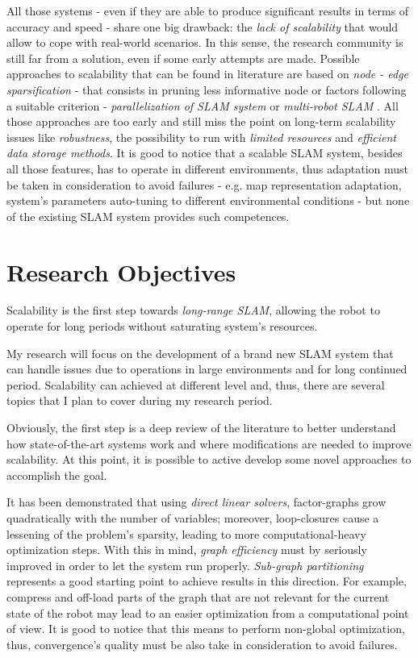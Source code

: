 \documentclass[10pt,a4paper, notitlepage]{report}
\begin{document}
All those systems - even if they are able to produce significant results in terms of accuracy and speed - share one big drawback: the \textit{lack of scalability} that would allow to cope with real-world scenarios. In this sense, the research community is still far from a solution, even if some early attempts are made. Possible approaches to scalability that can be found in literature are based on \textit{node - edge sparsification} \cite{kretzschmar2011graph-pruninig} \cite{huang2013consistent} - that consists in pruning less informative node or factors following a suitable criterion - \textit{parallelization of SLAM system} \cite{ni-dallaert2010nested-dissections} \cite{ni-dallaert2007tectonicSAM} \cite{grisetti2010hogman} or \textit{multi-robot SLAM} \cite{cunningham2013ddfSAM2} \cite{lazaro2013mr-slam}. All those approaches are too early and still miss the point on long-term scalability issues like \textit{robustness}, the possibility to run with \textit{limited resources} and \textit{efficient data storage methods}. It is good to notice that a scalable SLAM system, besides all those features, has to operate in different environments, thus adaptation must be taken in consideration to avoid failures - e.g. map representation adaptation, system's parameters auto-tuning to different environmental conditions - but none of the existing SLAM system provides such competences.

\section*{Research Objectives}
Scalability is the first step towards \textit{long-range SLAM}, allowing the robot to operate for long periods without saturating system's resources. 

My research will focus on the development of a brand new SLAM system that can handle issues due to operations in large environments and for long continued period. Scalability can achieved at different level and, thus, there are several topics that I plan to cover during my research period.

Obviously, the first step is a deep review of the literature to better understand how state-of-the-art systems work and where modifications are needed to improve scalability. At this point, it is possible to active develop some novel approaches to accomplish the goal.

It has been demonstrated that using \textit{direct linear solvers}, factor-graphs grow quadratically with the number of variables; moreover, loop-closures cause a lessening of the problem's sparsity, leading to more computational-heavy optimization steps. With this in mind, \textit{graph efficiency} must by seriously improved in order to let the system run properly. \textit{Sub-graph partitioning} \cite{grisetti2012condensed-m} represents a good starting point to achieve results in this direction. For example, compress and off-load parts of the graph that are not relevant for the current state of the robot may lead to an easier optimization from a computational point of view. It is good to notice that this means to perform non-global optimization, thus, convergence's quality must be also take in consideration to avoid failures.
\end{document}
